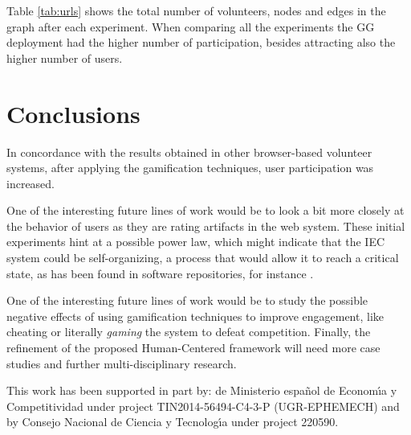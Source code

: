 Table \ref{tab:urls} shows the total number of volunteers, nodes and edges 
in the graph after each experiment. 
When comparing all the experiments the GG deployment had the higher
number of participation, besides attracting also the higher number of users.    

  
\section{Conclusions}
\label{sec:conclusions}

In concordance with the results obtained in other 
browser-based volunteer systems, after 
applying the gamification techniques, user participation was increased. 

One of the interesting future lines of work would be to look a bit
more closely at the behavior of users as they are rating artifacts 
in the web system. These initial experiments hint at a possible power law, which might indicate that
the IEC system could be self-organizing, a process that would allow it
to reach a critical state, as has been found in software repositories,
for instance \cite{Merelo2016:repomining}. 

One of the interesting future lines of work would be to study the possible negative effects of using  
gamification techniques to improve engagement, like cheating or
literally {\em gaming} the system to defeat competition. 
Finally, the refinement of the proposed Human-Centered framework will need
more case studies and further multi-disciplinary research. 

\begin{acks}
This work has been supported in part by: de Ministerio espa\~{n}ol de Econom\'{\i}a y Competitividad under project TIN2014-56494-C4-3-P (UGR-EPHEMECH) and by Consejo Nacional de Ciencia y Tecnolog\'{\i}a under project 220590.




\end{acks}
